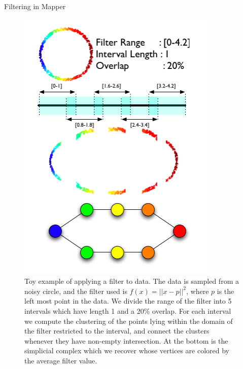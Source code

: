 \documentclass{beamer}
\begin{document}
\begin{frame}{Filtering in Mapper}
    \begin{figure}
        \begin{columns}
            \begin{column}{0.4\textwidth}
                \includegraphics[width = \linewidth]{filter.png}
            \end{column}
            \begin{column}{0.55\textwidth}
                \caption{Toy example of applying a filter to data\cite{mapper}. The data is sampled from a noisy circle, and the filter used is $f(x) = ||x - p||^2$, where $p$ is the left most point in the data. We divide the range of the filter into 5 intervals which have length 1 and a 20$\%$ overlap. For each interval we compute the clustering of the points lying within the domain of the filter restricted to the interval, and connect the clusters whenever they have non-empty intersection. At the bottom is the simplicial complex which we recover whose vertices are colored by the average filter value.}
            \end{column}
        \end{columns}
    \end{figure}
\end{frame}
\end{document}
